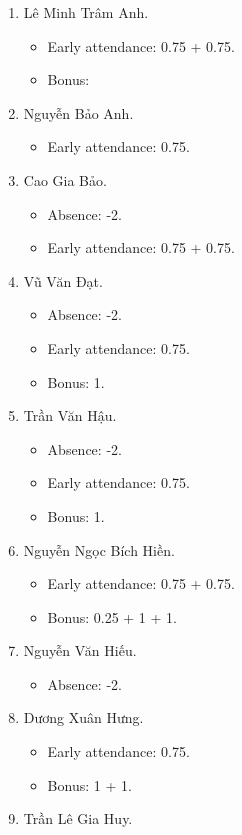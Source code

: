 \documentclass{article}
\begin{document}
\begin{enumerate}
	\item {\sc Lê Minh Trâm Anh.}
	\begin{itemize}
		\item Early attendance: 0.75 + 0.75.
		\item Bonus: 
	\end{itemize}
	\item {\sc Nguyễn Bảo Anh.}
	\begin{itemize}
		\item Early attendance: 0.75.
	\end{itemize}
	\item {\sc Cao Gia Bảo.}
	\begin{itemize}
		\item Absence: -2.
		\item Early attendance: 0.75 + 0.75.
	\end{itemize}
	\item {\sc Vũ Văn Đạt.}
	\begin{itemize}
		\item Absence: -2.
		\item Early attendance: 0.75.
		\item Bonus: 1.
	\end{itemize}
	\item {\sc Trần Văn Hậu.}
	\begin{itemize}
		\item Absence: -2.
		\item Early attendance: 0.75.
		\item Bonus: 1.
	\end{itemize}
	\item {\sc Nguyễn Ngọc Bích Hiền.}
	\begin{itemize}
		\item Early attendance: 0.75 + 0.75.
		\item Bonus: 0.25 + 1 + 1.
	\end{itemize}
	\item {\sc Nguyễn Văn Hiếu.}
	\begin{itemize}
		\item Absence: -2.
	\end{itemize}
	\item {\sc Dương Xuân Hưng.}
	\begin{itemize}
		\item Early attendance: 0.75.
		\item Bonus: 1 + 1.
	\end{itemize}
	\item {\sc Trần Lê Gia Huy.}

\end{enumerate}
\end{document}

